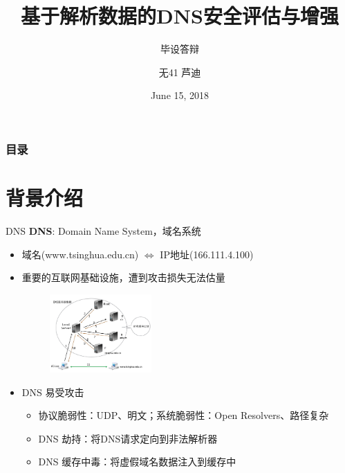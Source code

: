 \documentclass{beamer}
\title[毕设答辩] %
{基于解析数据的DNS安全评估与增强}
\subtitle{毕设答辩}
\author[芦迪] %
{无41 芦迪}
\institute[THU, EE] %
{
  \normalsize{指导老师：李星} \\
  \
  
  Department of Electronic Engineering,\\
  Tsinghua University
  
}
\date[2018.6.15] %
{June 15, 2018}
\begin{document}
\frame{\titlepage}


\begin{frame}
\frametitle{目录}
\tableofcontents
\end{frame}
\section{背景介绍}
\begin{frame}{DNS}
  \textbf{DNS}: Domain Name System，域名系统
  \begin{itemize}
    \item 域名(www.tsinghua.edu.cn) \(\Longleftrightarrow\) IP地址(166.111.4.100)
    \item 重要的互联网基础设施，遭到攻击损失无法估量
    \begin{figure}
      \includegraphics[height=3cm]{figures/dns/name_resolution.jpg}
      \end{figure}
    \item DNS 易受攻击
      \begin{itemize}
        \item  协议脆弱性：UDP、明文；系统脆弱性：Open Resolvers、路径复杂
        \item DNS 劫持：将DNS请求定向到非法解析器
        \item DNS 缓存中毒：将虚假域名数据注入到缓存中
      \end{itemize}
   
  \end{itemize}
  
\end{frame}
\end{document}
